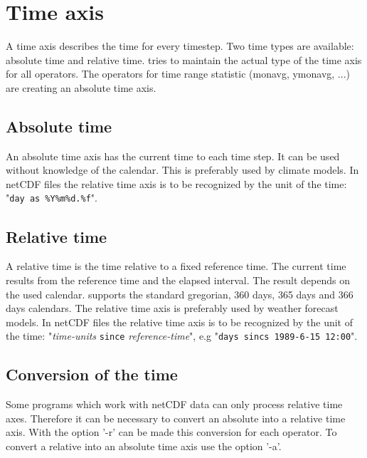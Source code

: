 \section{Time axis}

A time axis describes the time for every timestep.
Two time types are available: absolute time and relative time.
\CDO tries to maintain the actual type of the time axis for all operators.
The operators for time range statistic (monavg, ymonavg, ...) are
creating an absolute time axis.

\subsection{Absolute time}

An absolute time axis has the current time to each time step.
It can be used without knowledge of the calendar.
This is preferably used by climate models.
In netCDF files the relative time axis is to be recognized by the 
unit of the time: {"{\tt day as \%Y\%m\%d.\%f}"}.

\subsection{Relative time}

A relative time is the time relative to a fixed reference time.
The current time results from the reference time and the elapsed interval.
The result depends on the used calendar.
\CDO supports the standard gregorian, 360 days, 365 days and 366 days calendars.
The relative time axis is preferably used by weather forecast models.
In netCDF files the relative time axis is to be recognized by the 
unit of the time: {"{\it time-units} {\tt since} {\it reference-time}"},
e.g "{\tt days sincs 1989-6-15 12:00}".

\subsection{Conversion of the time}

Some programs which work with netCDF data can only process relative time axes.
Therefore it can be necessary to convert an absolute into a relative time axis.
With the \CDO option '-r' can be made this conversion for each operator.
To convert a relative into an absolute time axis use the \CDO option '-a'.

